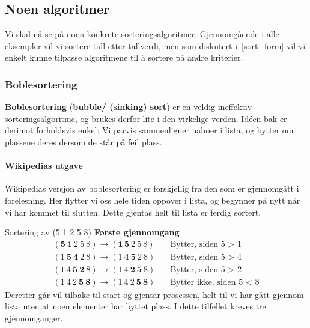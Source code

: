 \subsection{\color{red}Noen algoritmer}
Vi skal nå se på noen konkrete sorteringsalgoritmer. Gjennomgående i alle
eksempler vil vi sortere tall etter tallverdi, men som diskutert i~\ref{sort_form} vil vi enkelt kunne tilpasse algoritmene til å sortere på andre kriterier. 


\subsubsection{\color{red}Boblesortering}
\label{bubblesort}
\textbf{Boblesortering} (\textbf{bubble/ (sinking) sort})  er en veldig ineffektiv sorteringsalgoritme, og brukes derfor lite i den virkelige verden. 
Idéen bak er derimot forholdsvis enkel:
Vi parvis sammenligner naboer i lista, og bytter om plassene deres dersom de står på feil plass.

\paragraph*{Wikipedias utgave}\label{sec:bubble-wiki}
Wikipedias versjon av boblesortering er forskjellig fra den som er gjennomgått i forelesning.
Her flytter vi oss hele tiden oppover i lista, og begynner på nytt når vi har kommet til slutten.
Dette gjentas helt til lista er ferdig sortert.

\begin{eks} Sortering av (5 1 2 5 8) \newline
  \textbf{Første gjennomgang}
  \begin{align*}
    (\mathbf{5}~ \mathbf{1}~ 2~ 5~ 8) \rightarrow (\mathbf{1}\, \mathbf{5} ~ 2 ~ 5 ~ 8) &\quad \text{Bytter, siden 5 > 1} \\
    (1~ \mathbf{5}~ \mathbf{4}~ 2~ 8) \rightarrow (1 ~ \mathbf{4} ~ \mathbf{5} ~ 2 ~ 8) &\quad \text{Bytter, siden 5 > 4} \\
    (1~ 4~ \mathbf{5}~ \mathbf{2}~ 8) \rightarrow (1~ 4~ \mathbf{2}~ \mathbf{5}~ 8)     &\quad \text{Bytter, siden 5 > 2} \\
    (1~ 4~ 2~ \mathbf{5}~ \mathbf{8}) \rightarrow (1~ 4~ 2~ \mathbf{5}~ \mathbf{8})     &\quad \text{Bytter ikke, siden 5 < 8}
  \end{align*}
  Deretter går vil tilbake til start og gjentar prosessen, helt til vi har gått gjennom lista uten at noen elementer har byttet plass.
  I dette tilfellet kreves tre gjennomganger.
\end{eks}

